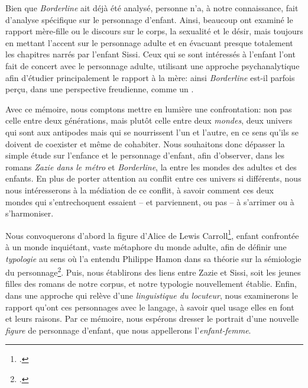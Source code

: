 Bien que \textit{Borderline} ait déjà été analysé, personne n'a, à notre connaissance, fait d'analyse spécifique sur le personnage d'enfant.
Ainsi, beaucoup ont examiné le rapport mère-fille ou le discours sur le corps, la sexualité et le désir, mais toujours en mettant l'accent sur le personnage adulte et en évacuant presque totalement les chapitres narrés par l'enfant Sissi.
Ceux qui se sont intéressés à l'enfant l'ont fait de concert avec le personnage adulte, utilisant une approche psychanalytique afin d'étudier principalement le rapport à la mère: ainsi \textit{Borderline} est-il parfois perçu, dans une perspective freudienne, comme un .
\par
Avec ce mémoire, nous comptons mettre en lumière une confrontation: non pas celle entre deux générations, mais plutôt celle entre deux \textit{mondes}, deux univers qui sont aux antipodes mais qui se nourrissent l'un et l'autre, en ce sens qu'ils se doivent de coexister et même de cohabiter.
Nous souhaitons donc dépasser la simple étude sur l'enfance et le personnage d'enfant, afin d'observer, dans les romans \textit{Zazie dans le métro} et \textit{Borderline}, la  entre les mondes des adultes et des enfants.
En plus de porter attention au conflit entre ces univers si différents, nous nous intéresserons à la médiation de ce conflit, à savoir comment ces deux mondes qui s'entrechoquent essaient -- et parviennent, ou pas -- à s'arrimer ou à s'harmoniser.
\par
Nous convoquerons d'abord la figure d'Alice de Lewis Carroll\footcite{Carroll2012}, enfant confrontée à un monde inquiétant, vaste métaphore du monde adulte, afin de définir une \textit{typologie} au sens où l'a entendu Philippe Hamon dans sa théorie sur la sémiologie du personnage\footcite{Hamon1977, Hamon1983}.
Puis, nous établirons des liens entre Zazie et Sissi, soit les jeunes filles des romans de notre corpus, et notre typologie nouvellement établie.
Enfin, dans une approche qui relève d'une \textit{linguistique du locuteur}, nous examinerons le rapport qu'ont ces personnages avec le langage, à savoir quel usage elles en font et leurs raisons.
Par ce mémoire, nous espérons dresser le portrait d'une nouvelle \textit{figure} de personnage d'enfant, que nous appellerons l'\textit{enfant-femme}.
